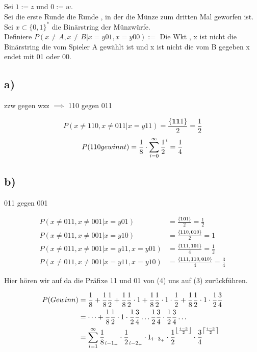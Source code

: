 \documentclass{article}
\def\mathify#1{\ifmmode{#1}\else\mbox{$#1$}\fi} %
\newcommand{\ceil}[1]{\mathify{\left\lceil {#1}\right\rceil}}
\newcommand{\floor}[1]{\mathify{\left\lfloor {#1}\right\rfloor}}
\begin{document}
Sei $1:= z $ und $0:= w $.\\
Sei die erste Runde die Runde , in der die Münze zum dritten Mal geworfen ist.\\
Sei $x \subset \{0,1\}^{*}$ die Binärstring der Münzwürfe.\\

Definiere $P(x \neq A , x\neq B | x = y01 , x = y00) := $ Die Wkt ,  x ist nicht die Binärstring die vom Spieler A gewählt ist und x ist nicht die vom B gegeben x endet mit 01 oder 00. 

	
\subsection*{a)}
zzw gegen wzz $\implies$ 110 gegen 011

\[
P(x \neq 110 , x \neq 011 | x = y11) = \frac{\{\textbf{11}1\}}{2} = \frac{1}{2} 
\]
\[
P(110  gewinnt) = \frac{1}{8} \cdot \sum_{i=0}^{\infty} \frac{1}{2}^i = \frac{1}{4} \\ 
\]

\subsection*{b)}
011 gegen 001

\begin{align}
P(x \neq 011 , x \neq 001 | x = y01) &= \frac{\{\textbf{10}1\}}{2} = \frac{1}{2} \\
P(x \neq 011 , x \neq 001 | x = y10) &= \frac{\{\textbf{11}0,\textbf{01}0\}}{2} = 1\\
P(x \neq 011 , x \neq 001 | x = y11 , x = y01) &= \frac{\{\textbf{11}1,\textbf{10}1\}}{4} = \frac{1}{2}\\
P(x \neq 011 , x \neq 001 | x = y11 , x = y10) &= \frac{\{\textbf{11}1,\textbf{11}0,\textbf{01}0\}}{4} = \frac{3}{4}
\end{align}

Hier hören wir auf da die Präfixe 11 und 01 von (4) uns auf (3) zurückführen. 

\begin{align}
P(Gewinn) &= \frac{1}{8} + \frac{1}{8} \frac{1}{2} + \frac{1}{8}\frac{1}{2}\cdot 1 + \frac{1}{8}\frac{1}{2}\cdot 1 \cdot \frac{1}{2} + \frac{1}{8}\frac{1}{2}\cdot 1 \cdot \frac{1}{2} \frac{3}{4} \\
&= \dots +  \frac{1}{8}\frac{1}{2}\cdot 1 \cdot \frac{1}{2} \frac{3}{4} \dots \frac{1}{2} \frac{3}{4} \cdot \frac{1}{2} \frac{3}{4} \dots \\
&= \sum_{i=1}^{\infty} \frac{1}{8}_{i-1_+} \cdot \frac{1}{2}_{i-2_+} \cdot 1_{i-3_+} \cdot \frac{1}{2}^{\floor{\frac{i-3}{2}}} \cdot \frac{3}{4}^{\ceil{\frac{i-3}{2}}}
\end{align}
\end{document}
